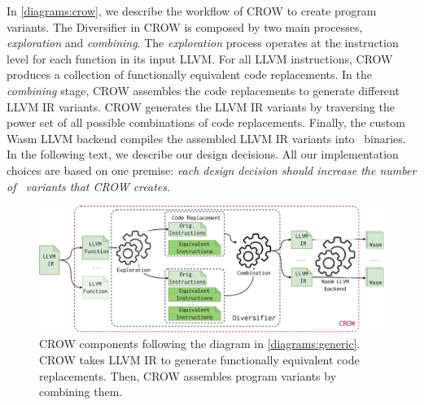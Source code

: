 In \autoref{diagrams:crow}, we describe the workflow of CROW to create program variants.
The Diversifier in CROW is composed by two main processes, \textit{exploration} and \textit{combining}. 
The \emph{exploration} process operates at the instruction level for each function in its input LLVM.
For all LLVM instructions, CROW produces a collection of functionally equivalent code replacements.   
In the \emph{combining} stage, CROW assembles the code replacements to generate different LLVM IR variants.
CROW generates the LLVM IR variants by traversing the power set of all possible combinations of code replacements.
Finally, the custom Wasm LLVM backend compiles the assembled LLVM IR variants into \wasm\ binaries.
In the following text, we describe our design decisions. All our implementation choices are based on one premise: \emph{each design decision should increase the number of \wasm\ variants that CROW creates.}

\begin{figure}[h]
    \includegraphics[width=\linewidth]{diagrams/generation/crow.drawio.pdf}
    \caption{CROW components following the diagram in \autoref{diagrams:generic}. CROW takes LLVM IR to generate functionally equivalent code replacements. Then, CROW assembles program variants by combining them.}
    \label{diagrams:crow}
\end{figure}



